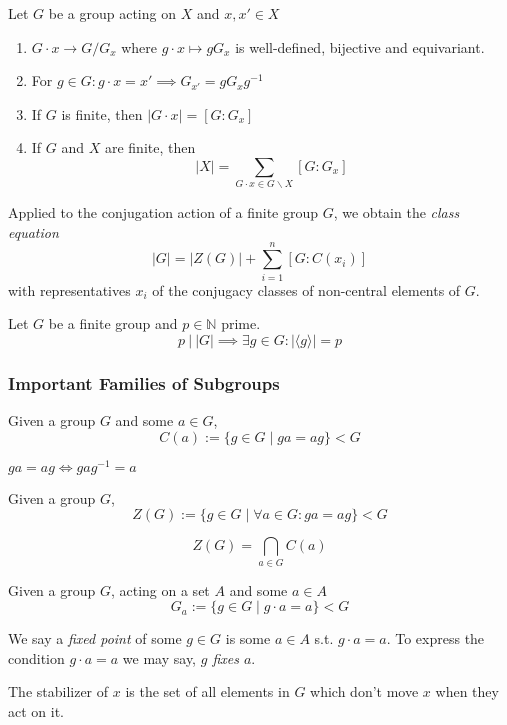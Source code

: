 \begin{proposition}
   Let \(G\) be a group acting on \(X\) and \(x, x' \in X\)
   \begin{enumerate}[label=\roman*, align=Center]
      \item \(G \cdot x \to G/G_x\) where \(g \cdot x \mapsto gG_x\) is well-defined, bijective and equivariant.
      \item For \(g \in G: g \cdot x = x' \implies G_{x'} = gG_xg^{-1}\)
      \item If \(G\) is finite, then \(|G \cdot x| = [G : G_x]\)
      \item If \(G\) and \(X\) are finite, then
         \[|X| = \sum_{G \cdot x \in G \backslash X} [G : G_x]\]
   \end{enumerate}
\end{proposition}
\begin{remark}
   Applied to the conjugation action of a finite group \(G\), we obtain the \emph{class equation}
   \[|G| = |Z(G)| + \sum_{i=1}^n [G : C(x_i)]\]
   with representatives \(x_i\) of the conjugacy classes of non-central elements of \(G\).
\end{remark}

\begin{proposition}
   Let \(G\) be a finite group and \(p \in \mathbb{N}\) prime.
   \[p~|~|G| \implies \exists g \in G: |\langle g\rangle| = p\]
\end{proposition}

\subsubsection{Important Families of Subgroups}
\begin{definition}[Centralizer]
   Given a group \(G\) and some \(a \in G\),
   \[C(a) := \{g \in G \mid ga = ag\} < G\]
\end{definition}
\begin{remark}
   \(ga = ag \iff gag^{-1} = a\)
\end{remark}

\begin{definition}[Center]
   Given a group \(G\),
   \[Z(G) := \{g \in G \mid \forall a \in G: ga = ag\} < G\]
\end{definition}
\begin{remark}
   \[Z(G) = \bigcap_{a \in G} C(a)\]
\end{remark}

\begin{definition}[Stabilizer]
   Given a group \(G\), acting on a set \(A\) and some \(a \in A\)
   \[G_a := \{g \in G \mid g \cdot a = a\} < G\]
\end{definition}
\begin{remark}[Terminology]
   We say a \emph{fixed point} of some \(g \in G\) is some \(a \in A\) s.t. \(g \cdot a = a\).
   To express the condition \(g \cdot a = a\) we may say, \emph{\(g\) fixes \(a\)}.
\end{remark}
\begin{remark}[Intuition]
   The stabilizer of \(x\) is the set of all elements in \(G\) which don't move \(x\) when they act on it.
\end{remark}

